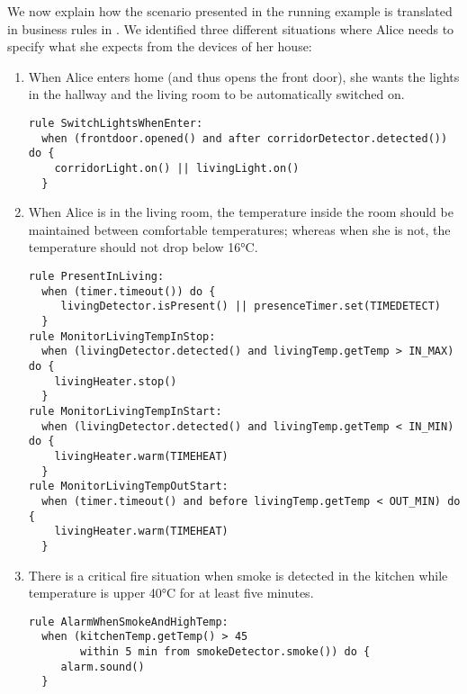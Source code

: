 We now explain how the scenario presented in the running example is translated in business rules in \IOTDSL. We identified three different situations where Alice needs to specify what she expects from the devices of her house:
\begin{enumerate}
	\item When Alice enters home (and thus opens the front door), she wants the lights in the hallway and the living room to be automatically switched on. 

\begin{lstlisting}[language=iotdsl]
rule SwitchLightsWhenEnter:
  when (frontdoor.opened() and after corridorDetector.detected()) do {
    corridorLight.on() || livingLight.on()
  }
\end{lstlisting}	
	
	\item When Alice is in the living room, the temperature inside the room should be maintained between comfortable temperatures; whereas when she is not, the temperature should not drop below 16°C.
	
	
\begin{lstlisting}[language=iotdsl]
rule PresentInLiving:	
  when (timer.timeout()) do {
     livingDetector.isPresent() || presenceTimer.set(TIMEDETECT)
  }
rule MonitorLivingTempInStop:
  when (livingDetector.detected() and livingTemp.getTemp > IN_MAX) do {
    livingHeater.stop()
  }
rule MonitorLivingTempInStart:
  when (livingDetector.detected() and livingTemp.getTemp < IN_MIN) do {
    livingHeater.warm(TIMEHEAT)
  }
rule MonitorLivingTempOutStart:
  when (timer.timeout() and before livingTemp.getTemp < OUT_MIN) do {
    livingHeater.warm(TIMEHEAT)
  }
\end{lstlisting}
	
	\item There is a critical fire situation when smoke is detected in the kitchen while temperature is upper 40°C for at least five minutes.

\begin{lstlisting}[language=iotdsl]
rule AlarmWhenSmokeAndHighTemp:	
  when (kitchenTemp.getTemp() > 45 
        within 5 min from smokeDetector.smoke()) do {
     alarm.sound()
  }
\end{lstlisting}
\end{enumerate}



